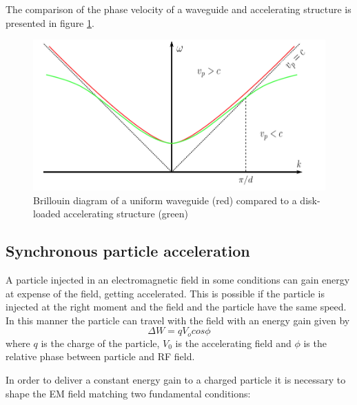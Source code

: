 The comparison of the phase velocity of a waveguide and accelerating structure is presented in figure \ref{vp_fig}.



\begin{figure}[h]
\centering

\includegraphics[scale=0.4]{pictures/vp}
\caption{Brillouin diagram of a uniform waveguide (red) compared to a disk-loaded accelerating structure (green) \cite{Kovermann:1330346}}
\label{vp_fig}

\end{figure}




\subsection[Synchronous particle acceleration]{Synchronous particle acceleration}

A particle injected in an electromagnetic field in some conditions can gain energy at expense of the field, getting accelerated. This is possible if the particle is injected at the right moment and the field and the particle have the same speed. In this manner the particle can travel with the field with an energy gain given by
\begin{equation}
\Delta W = q V_o cos \phi
\end{equation}
where $q$ is the charge of the particle, $V_0$ is the accelerating field and $\phi$ is the relative phase between particle and RF field.

In order to deliver a  constant energy gain to a charged particle it is necessary to shape the EM field matching  two fundamental conditions:

